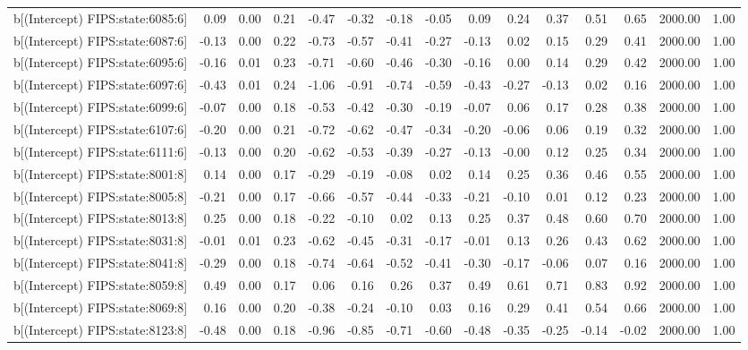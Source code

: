 \begin{table}[ht]
\begin{tabular}{rrrrrrrrrrrrrrr}
  b[(Intercept) FIPS:state:6085:6] & 0.09 & 0.00 & 0.21 & -0.47 & -0.32 & -0.18 & -0.05 & 0.09 & 0.24 & 0.37 & 0.51 & 0.65 & 2000.00 & 1.00 \\ 
  b[(Intercept) FIPS:state:6087:6] & -0.13 & 0.00 & 0.22 & -0.73 & -0.57 & -0.41 & -0.27 & -0.13 & 0.02 & 0.15 & 0.29 & 0.41 & 2000.00 & 1.00 \\ 
  b[(Intercept) FIPS:state:6095:6] & -0.16 & 0.01 & 0.23 & -0.71 & -0.60 & -0.46 & -0.30 & -0.16 & 0.00 & 0.14 & 0.29 & 0.42 & 2000.00 & 1.00 \\ 
  b[(Intercept) FIPS:state:6097:6] & -0.43 & 0.01 & 0.24 & -1.06 & -0.91 & -0.74 & -0.59 & -0.43 & -0.27 & -0.13 & 0.02 & 0.16 & 2000.00 & 1.00 \\ 
  b[(Intercept) FIPS:state:6099:6] & -0.07 & 0.00 & 0.18 & -0.53 & -0.42 & -0.30 & -0.19 & -0.07 & 0.06 & 0.17 & 0.28 & 0.38 & 2000.00 & 1.00 \\ 
  b[(Intercept) FIPS:state:6107:6] & -0.20 & 0.00 & 0.21 & -0.72 & -0.62 & -0.47 & -0.34 & -0.20 & -0.06 & 0.06 & 0.19 & 0.32 & 2000.00 & 1.00 \\ 
  b[(Intercept) FIPS:state:6111:6] & -0.13 & 0.00 & 0.20 & -0.62 & -0.53 & -0.39 & -0.27 & -0.13 & -0.00 & 0.12 & 0.25 & 0.34 & 2000.00 & 1.00 \\ 
  b[(Intercept) FIPS:state:8001:8] & 0.14 & 0.00 & 0.17 & -0.29 & -0.19 & -0.08 & 0.02 & 0.14 & 0.25 & 0.36 & 0.46 & 0.55 & 2000.00 & 1.00 \\ 
  b[(Intercept) FIPS:state:8005:8] & -0.21 & 0.00 & 0.17 & -0.66 & -0.57 & -0.44 & -0.33 & -0.21 & -0.10 & 0.01 & 0.12 & 0.23 & 2000.00 & 1.00 \\ 
  b[(Intercept) FIPS:state:8013:8] & 0.25 & 0.00 & 0.18 & -0.22 & -0.10 & 0.02 & 0.13 & 0.25 & 0.37 & 0.48 & 0.60 & 0.70 & 2000.00 & 1.00 \\ 
  b[(Intercept) FIPS:state:8031:8] & -0.01 & 0.01 & 0.23 & -0.62 & -0.45 & -0.31 & -0.17 & -0.01 & 0.13 & 0.26 & 0.43 & 0.62 & 2000.00 & 1.00 \\ 
  b[(Intercept) FIPS:state:8041:8] & -0.29 & 0.00 & 0.18 & -0.74 & -0.64 & -0.52 & -0.41 & -0.30 & -0.17 & -0.06 & 0.07 & 0.16 & 2000.00 & 1.00 \\ 
  b[(Intercept) FIPS:state:8059:8] & 0.49 & 0.00 & 0.17 & 0.06 & 0.16 & 0.26 & 0.37 & 0.49 & 0.61 & 0.71 & 0.83 & 0.92 & 2000.00 & 1.00 \\ 
  b[(Intercept) FIPS:state:8069:8] & 0.16 & 0.00 & 0.20 & -0.38 & -0.24 & -0.10 & 0.03 & 0.16 & 0.29 & 0.41 & 0.54 & 0.66 & 2000.00 & 1.00 \\ 
  b[(Intercept) FIPS:state:8123:8] & -0.48 & 0.00 & 0.18 & -0.96 & -0.85 & -0.71 & -0.60 & -0.48 & -0.35 & -0.25 & -0.14 & -0.02 & 2000.00 & 1.00 \\ 

\end{tabular}
\end{table}
